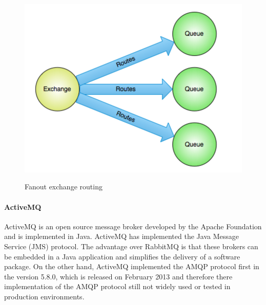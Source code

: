 \begin{itemize}
\begin{figure}[htb]
  \centering
  \includegraphics[scale=0.6]{rabbit_mq_fanout.png}\\
  \caption{Fanout exchange routing}
  \label{fig:rabbit_mq_fanout}
  \protect\cite{amqp-concepts}
\end{figure}

\end{itemize}

\paragraph{ActiveMQ}
ActiveMQ is an open source message broker developed by the Apache Foundation and is implemented in Java. ActiveMQ has implemented the Java Message Service (JMS) protocol. The advantage over RabbitMQ is that these brokers can be embedded in a Java application and simplifies the delivery of a software package. On the other hand, ActiveMQ implemented the \ac{AMQP} protocol first in the version 5.8.0, which is released on February 2013 and therefore there implementation of the \ac{AMQP} protocol still not widely used or tested in production environments.
  
